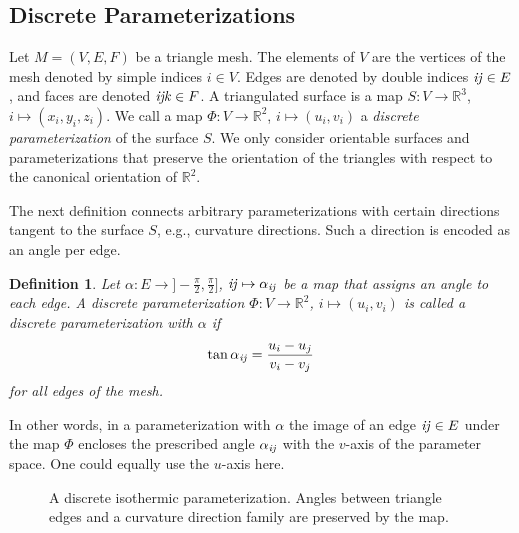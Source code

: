 \documentclass[twoside]{article}
\newtheorem{definition}{Definition}[section]
\begin{document}
\subsection{Discrete Parameterizations}
Let $M=(V,E,F)$ be a triangle mesh. The elements of $V$ are the vertices of the
mesh denoted by simple indices $i\in V$. Edges are denoted by double
indices $\mathrm{\it{ij}}\in E$, and faces are denoted $\mathrm{\it{ijk}}\in F$. A triangulated surface is
a map $S:V\to \mathbb R^3$, $i \mapsto (x_i, y_i, z_i)$.
We call a map $\Phi: V \to \mathbb R^2$, $i \mapsto (u_i,v_i)$ a \emph{discrete
parameterization} of the surface $S$. We only consider orientable surfaces and
parameterizations that preserve the orientation of the triangles with respect to
the canonical orientation of $\mathbb R^2$. 

The next definition connects arbitrary parameterizations with certain directions
tangent to the surface $S$, e.g., curvature directions. Such a direction is encoded as 
an angle per edge. 
\begin{definition}
Let $\alpha : E \to ]-\frac{\pi}{2},\frac{\pi}{2}]$, $\mathrm{\it{ij}} \mapsto \alpha_{\mathrm{\it{ij}}}$
be a map that assigns an angle to each edge. A discrete parameterization 
$\Phi: V\to \mathbb R^2$, $i \mapsto (u_i,v_i)$ is called a \emph{discrete
parameterization with $\alpha$} if
\begin{equation}
\label{eq:isothermic}
\tan \alpha_{\mathrm{\it{ij}}} = \frac{u_i - u_j}{v_i - v_j}
\end{equation}
for all edges of the mesh.
\end{definition}
In other words, in a parameterization with $\alpha$ the image of an edge $\mathrm{\it{ij}}\in
E$ under the map $\Phi$ encloses the prescribed angle $\alpha_{\mathrm{\it{ij}}}$ with the
$v$-axis of the parameter space. One could equally use the $u$-axis here.

\begin{figure}[t]
\centering

\caption{A discrete isothermic parameterization. Angles between triangle edges 
and a curvature direction family are preserved by the map.}
\label{fig:parameterization}
\end{figure}
\end{document}
